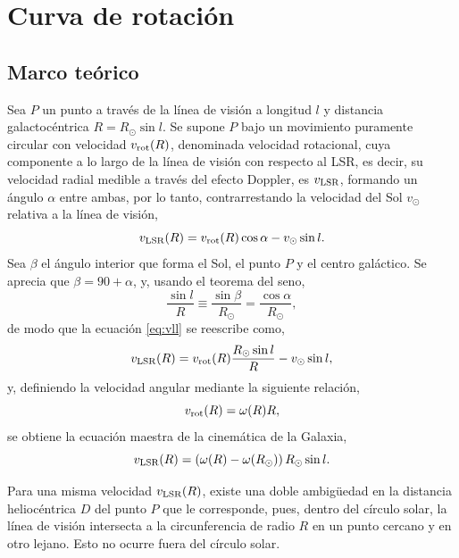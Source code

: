 \section{Curva de rotación}

\subsection{Marco teórico}

Sea $P$ un punto a través de la línea de visión a longitud $l$ y distancia galactocéntrica $R=R_\odot\sin l$. Se supone $P$ bajo un movimiento puramente circular con velocidad $v_\textnormal{rot}(R)$, denominada velocidad rotacional, cuya componente a lo largo de la línea de visión con respecto al LSR, es decir, su velocidad radial medible a través del efecto Doppler, es $v_\textnormal{LSR}$, formando un ángulo $\alpha$ entre ambas, por lo tanto, contrarrestando la velocidad del Sol $v_\odot$ relativa a la línea de visión,
\begin{equation}
v_\textnormal{LSR}(R)=v_\textnormal{rot}(R)\cos\alpha-v_\odot\sin l
.\label{eq:vll}\end{equation}
Sea $\beta$ el ángulo interior que forma el Sol, el punto $P$ y el centro galáctico. Se aprecia que $\beta=90+\alpha$, y, usando el teorema del seno,
\begin{equation}
\frac{\sin l}{R}\equiv\frac{\sin\beta}{R_\odot}=\frac{\cos\alpha}{R_\odot}
,\end{equation}
de modo que la ecuación \ref{eq:vll} se reescribe como,
\begin{equation}
v_\textnormal{LSR}(R)=v_\textnormal{rot}(R)\frac{R_\odot\sin l}{R}-v_\odot\sin l
,\label{eq:nomaestra}
\end{equation}
y, definiendo la velocidad angular mediante la siguiente relación,
\begin{equation}
v_\textnormal{rot}(R)=\omega(R)R
,\end{equation}
se obtiene la ecuación maestra de la cinemática de la Galaxia,
\begin{equation}
v_\textnormal{LSR}(R)=\left(\omega(R)-\omega(R_\odot)\right)R_\odot\sin l
.\label{eq:maestra}\end{equation}

Para una misma velocidad $v_\textnormal{LSR}(R)$, existe una doble ambigüedad en la distancia heliocéntrica $D$ del punto $P$ que le corresponde, pues, dentro del círculo solar, la línea de visión intersecta a la circunferencia de radio $R$ en un punto cercano y en otro lejano. Esto no ocurre fuera del círculo solar.

